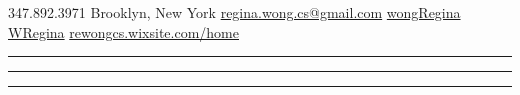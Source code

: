 \documentclass[]{deedy-resume-openfont}
\begin{document}
%
%

%
%

{ \faMobilePhone \hspace{0.4 cm} 347.892.3971}
{ \faMapMarker \hspace{0.4 cm}Brooklyn, New York}
{\href{mailto:regina.wong.cs@gmail.com}{ \faEnvelopeSquare \hspace{0.1 in} regina.wong.cs@gmail.com}}
{ \href{https://github.com/wongRegina}{\faGithubSquare\hspace{0.1 in} wongRegina}}
{\href{https://www.linkedin.com/in/wregina}{ \faLinkedinSquare \hspace{0.1 in} WRegina}}
{\href{https://rewongcs.wixsite.com/home} { \faLaptop \hspace{0.15 cm} rewongcs.wixsite.com/home}}




\hrule

\noindent\makebox[\linewidth]{\rule{\textwidth}{0.4pt}}

\hrule

\vspace{-7pt}
\noindent\makebox[\linewidth]{\rule{\textwidth}{0.4pt}}


\hrule

\end{document}
